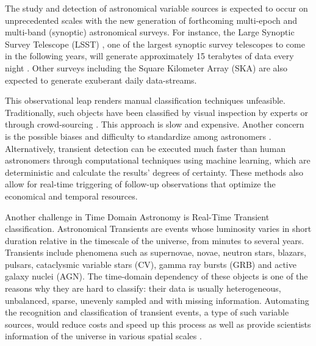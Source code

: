 \documentclass[a4paper,fleqn,usenatbib]{mnras}
\begin{document}
The study and detection of astronomical variable sources is expected
to occur on unprecedented scales with the new generation of
forthcoming multi-epoch and multi-band (synoptic) astronomical
surveys. 
For instance, the Large Synoptic Survey Telescope (LSST)
\citep{0805.2366}, one of the largest synoptic survey telescopes to
come in the following years, will generate approximately 15 terabytes
of data every night \citep{1512.07914}.  
Other surveys including the Square Kilometer Array (SKA) are also expected
to generate exuberant daily data-streams. 

This observational leap renders manual classification techniques
unfeasible.   
Traditionally, such objects have been classified by visual inspection
by experts or through crowd-sourcing
\citep{1011.2199,0708.2750}. 
This approach is slow and expensive.
Another concern is the possible biases and difficulty to standardize among 
astronomers \citep{1104.3142}. 
Alternatively, transient detection can be executed much faster than
human astronomers through computational techniques using machine
learning, 
which are deterministic and calculate the results' degrees of
certainty. 
These methods also allow for real-time triggering of follow-up
observations that optimize the economical and temporal resources. 
 

Another challenge in  Time Domain Astronomy is Real-Time Transient classification. 
Astronomical Transients are events whose luminosity varies in short duration
relative in the timescale of the universe, from minutes to several
years. 
Transients include phenomena such as supernovae, novae, neutron
stars, blazars, pulsars, cataclysmic variable stars (CV), gamma ray
bursts (GRB) and active galaxy nuclei (AGN). 
The time-domain dependency of these objects is one of the reasons why
they are hard to classify: their data is usually heterogeneous,
unbalanced, sparse, unevenly sampled and with missing information. 
Automating the recognition and classification of transient events, a type of such
variable sources, would reduce costs and speed up this process as well
as provide scientists information of the universe in various spatial
scales \citep{2011arXiv1110.4655D}.  
\end{document}
